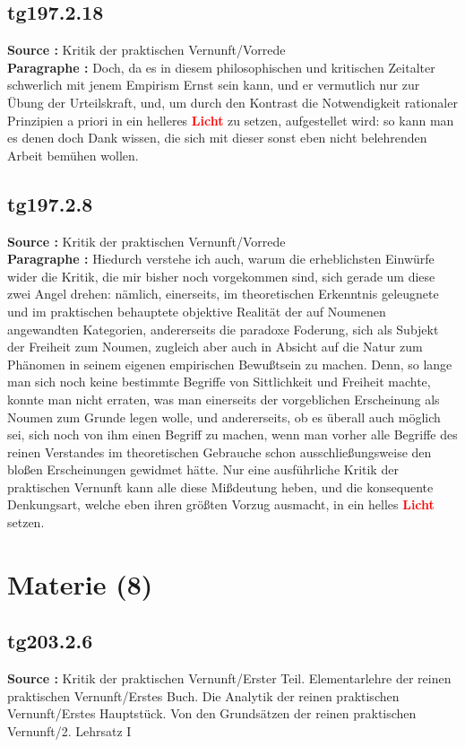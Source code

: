 \documentclass[a4paper,12pt,twoside]{book}
\newcommand{\match}[1]{\textcolor{red}{\textbf{#1}}}
\newcommand{\unnumberedsection}[1]{
	\section*{#1}
	\addcontentsline{toc}{section}{#1}
	\markright{#1}
}
\begin{document}
	\subsection*{tg197.2.18} 
	\textbf{Source : }Kritik der praktischen Vernunft/Vorrede\\  
	
	\noindent\textbf{Paragraphe : }Doch, da es in diesem philosophischen und kritischen Zeitalter schwerlich mit jenem Empirism Ernst sein kann, und er vermutlich nur zur Übung der Urteilskraft, und, um durch den Kontrast die Notwendigkeit rationaler Prinzipien a priori in ein helleres \match{Licht} zu setzen, aufgestellet wird: so kann man es denen doch Dank wissen, die sich mit dieser sonst eben nicht belehrenden Arbeit bemühen wollen. 
	
	\subsection*{tg197.2.8} 
	\textbf{Source : }Kritik der praktischen Vernunft/Vorrede\\  
	
	\noindent\textbf{Paragraphe : }
	Hiedurch verstehe ich auch, warum die erheblichsten Einwürfe wider die Kritik, die mir bisher noch vorgekommen sind, sich gerade um diese zwei Angel drehen: nämlich, einerseits, im theoretischen Erkenntnis geleugnete und im praktischen behauptete objektive Realität der auf Noumenen angewandten Kategorien, andererseits die paradoxe Foderung, sich als Subjekt der Freiheit zum Noumen, zugleich aber auch in Absicht auf die Natur zum Phänomen in seinem eigenen empirischen Bewußtsein zu machen. Denn, so lange man sich noch keine bestimmte Begriffe von Sittlichkeit und Freiheit machte, konnte man nicht erraten, was man einerseits der vorgeblichen Erscheinung als Noumen zum Grunde legen wolle, und andererseits, ob es überall auch möglich sei, sich noch von ihm einen Begriff zu machen, wenn man vorher alle Begriffe des reinen Verstandes im theoretischen Gebrauche schon ausschließungsweise den bloßen Erscheinungen gewidmet hätte. Nur eine ausführliche Kritik der praktischen Vernunft kann alle diese Mißdeutung heben, und die konsequente Denkungsart, welche eben ihren größten Vorzug ausmacht, in ein helles \match{Licht} setzen. 
	
	\unnumberedsection{Materie (8)} 
	\subsection*{tg203.2.6} 
	\textbf{Source : }Kritik der praktischen Vernunft/Erster Teil. Elementarlehre der reinen praktischen Vernunft/Erstes Buch. Die Analytik der reinen praktischen Vernunft/Erstes Hauptstück. Von den Grundsätzen der reinen praktischen Vernunft/2. Lehrsatz I\\  
	
\end{document}
